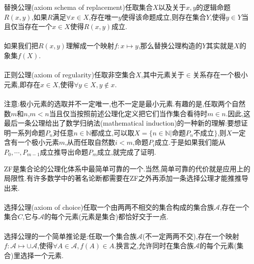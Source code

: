 \begin{frame}
\alert{替换公理}(axiom schema of replacement)任取集合$X$以及关于$x,y$的逻辑命题$R(x,y)$,如果$R$满足$\forall x\in X$,存在唯一$y$使得该命题成立,则存在集合$Y$,使得$y\in Y$当且仅当存在一个$x\in X$使得$R(x,y)$成立.
\\ \hspace*{\fill} \\%
如果我们把$R(x,y)$理解成一个映射$f:x\mapsto y$,那么替换公理构造的$Y$其实就是$X$的象集$f(X)$.
\\ \hspace*{\fill} \\%
\alert{正则公理}(axiom of regularity)任取非空集合$X$,其中元素关于$\in$关系存在一个极小元素,即存在$x\in X$,使得$\forall y\in X,y\notin x$.
\\ \hspace*{\fill} \\%
注意:极小元素的选取并不一定唯一,也不一定是最小元素.有趣的是,任取两个自然数$m$和$n$,$m<n$当且仅当按照前述公理化定义把它们当作集合看待时$m\in n$.因此,这最后一条公理给出了\alert{数学归纳法}(mathematical induction)的一种新的理解:要想证明一系列命题$P_n$对任意$n\in\mathbb{N}$都成立,可以取$X=\{ n\in\mathbb{N}|\text{命题}P_n\text{不成立} \}$,则$X$一定含有一个极小元素$m$,从而任取自然数$i<m$,命题$P_i$成立.于是如果我们能从$P_0,\cdots,P_{m-1}$成立推导出命题$P_m$成立,就完成了证明.
\end{frame}


\begin{frame}
ZF是集合论的公理化体系中最简单可靠的一个.当然,简单可靠的代价就是应用上的局限性.有许多数学中的著名论断都需要在ZF之外再添加一条选择公理才能推推导出来.
\\ \hspace*{\fill} \\%
\alert{选择公理}(axiom of choice)任取一个由两两不相交的集合构成的集合族$\mathcal{A}$,存在一个集合$C$,它与$\mathcal{A}$的每个元素(元素是集合)都恰好交于一点.
\\ \hspace*{\fill} \\%
选择公理的一个简单推论是:任取一个集合族$\mathcal{A}$(不一定两两不交),存在一个映射$f:\mathcal{A}\mapsto\cup\mathcal{A}$,使得$\forall A\in\mathcal{A},f(A)\in A$.换言之,允许同时在集合族$\mathcal{A}$的每个元素(集合)里选择一个元素.


\end{frame}


